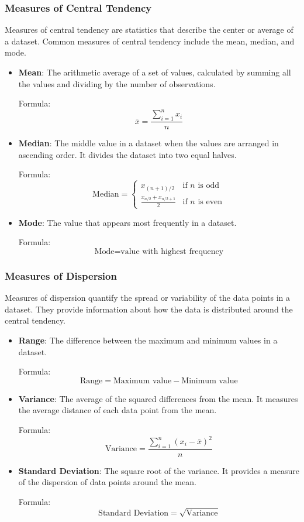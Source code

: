 \documentclass[11pt]{article}
\begin{document}
\subsubsection{Measures of Central Tendency}
Measures of central tendency are statistics that describe the center or average of a dataset. Common measures of central tendency include the mean, median, and mode.
\begin{itemize}
    \item \textbf{Mean}: The arithmetic average of a set of values, calculated by summing all the values and dividing by the number of observations.

          Formula: \[ \bar{x} = \frac{\sum_{i=1}^{n} x_i}{n} \]
    \item \textbf{Median}: The middle value in a dataset when the values are arranged in ascending order. It divides the dataset into two equal halves.

          Formula: \[ \text{Median} = \begin{cases} x_{(n+1)/2} & \text{if } n \text{ is odd} \\ \frac{x_{n/2} + x_{n/2 + 1}}{2} & \text{if } n \text{ is even} \end{cases} \]
    \item \textbf{Mode}: The value that appears most frequently in a dataset.

          Formula: \[ \text{Mode} = \text{value with highest frequency} \]
\end{itemize}

\subsubsection{Measures of Dispersion}
Measures of dispersion quantify the spread or variability of the data points in a dataset. They provide information about how the data is distributed around the central tendency.
\begin{itemize}
    \item \textbf{Range}: The difference between the maximum and minimum values in a dataset.

          Formula:
          \[ \text{Range} = \text{Maximum value} - \text{Minimum value} \]
    \item \textbf{Variance}: The average of the squared differences from the mean. It measures the average distance of each data point from the mean.

          Formula:
          \[ \text{Variance} = \frac{\sum_{i=1}^{n} (x_i - \bar{x})^2}{n} \]
    \item \textbf{Standard Deviation}: The square root of the variance. It provides a measure of the dispersion of data points around the mean.

          Formula:
          \[ \text{Standard Deviation} = \sqrt{\text{Variance}} \]
\end{itemize}
\end{document}
